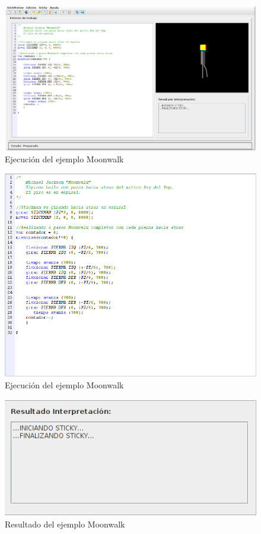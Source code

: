 \documentclass[a4paper, 12pt]{book}
\begin{document}
\begin{itemize}
  \begin{figure}[htb]
    \centerline{\includegraphics[width=\textwidth]{./imagenes/moonwalk.png}}
    \caption{Ejecución del ejemplo Moonwalk}
  \end{figure}
  

  \begin{figure}[htb]
    \centerline{\includegraphics[width=\textwidth]{./imagenes/moonwalk-codigo.png}}
    \caption{Ejecución del ejemplo Moonwalk}
  \end{figure}
  
  
  
\begin{figure}[htb]
  \centerline{\includegraphics[width=\textwidth]{./imagenes/moonwalk-resultado.png}}
  \caption{Resultado del ejemplo Moonwalk}
\end{figure}



\end{itemize}
\end{document}
